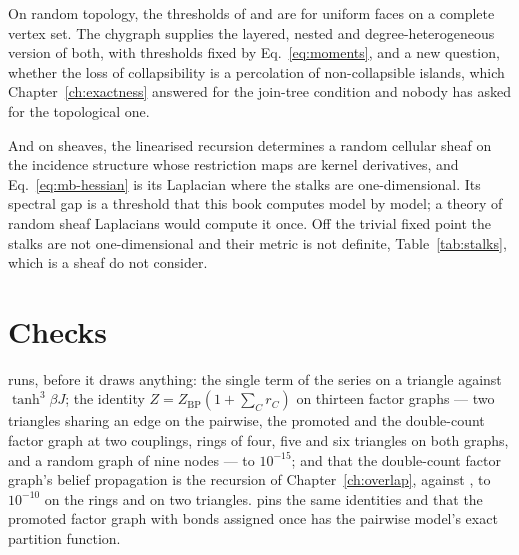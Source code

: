 On random topology, the thresholds of \citet{linial2006} and
\citet{aronshtam2013} are for uniform faces on a complete vertex set. The
chygraph supplies the layered, nested and degree-heterogeneous version of
both, with thresholds fixed by Eq.~\eqref{eq:moments}, and a new question,
whether the loss of collapsibility is a percolation of non-collapsible
islands, which Chapter~\ref{ch:exactness} answered for the join-tree
condition and nobody has asked for the topological one.

And on sheaves, the linearised recursion determines a random cellular sheaf
on the incidence structure whose restriction maps are kernel derivatives,
and Eq.~\eqref{eq:mb-hessian} is its Laplacian where the stalks are
one-dimensional. Its spectral gap is a threshold that this book computes
model by model; a theory of random sheaf Laplacians would compute it once.
Off the trivial fixed point the stalks are not one-dimensional and their
metric is not definite, Table~\ref{tab:stalks}, which is a sheaf
\citet{hansen2019} do not consider.

\section{Checks}
\label{sec:mb-checks}

 runs, before it draws
anything: the single term of the series on a triangle against
$\tanh^{3}\beta J$; the identity $Z=Z_{\mathrm{BP}}(1+\sum_{C}r_{C})$ on
thirteen factor graphs --- two triangles sharing an edge on the pairwise,
the promoted and the double-count factor graph at two couplings, rings of
four, five and six triangles on both graphs, and a random graph of nine
nodes --- to $10^{-15}$; and that the double-count factor graph's belief
propagation is the recursion of Chapter~\ref{ch:overlap}, against
, to $10^{-10}$ on the rings and on two triangles.
 pins the same identities and that the promoted
factor graph with bonds assigned once has the pairwise model's exact
partition function.

